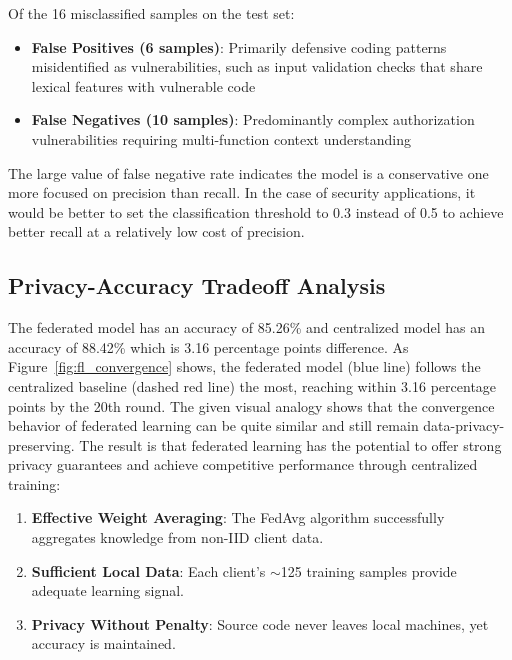 \documentclass[pdflatex,sn-mathphys-num]{sn-jnl}
\theoremstyle{thmstyleone}%
\theoremstyle{thmstyletwo}%
\theoremstyle{thmstylethree}%
\begin{document}
Of the 16 misclassified samples on the test set:
\begin{itemize}
    \item \textbf{False Positives (6 samples)}: Primarily defensive coding patterns misidentified as vulnerabilities, such as input validation checks that share lexical features with vulnerable code
    \item \textbf{False Negatives (10 samples)}: Predominantly complex authorization vulnerabilities requiring multi-function context understanding
\end{itemize}

The large value of false negative rate indicates the model is a conservative one more focused on precision than recall. In the case of security applications, it would be better to set the classification threshold to 0.3 instead of 0.5 to achieve better recall at a relatively low cost of precision.

\subsection{Privacy-Accuracy Tradeoff Analysis}\label{subsec:tradeoff}

The federated model has an accuracy of 85.26\% and centralized model has an accuracy of 88.42\% which is 3.16 percentage points difference. As Figure~\ref{fig:fl_convergence} shows, the federated model (blue line) follows the centralized baseline (dashed red line) the most, reaching within 3.16 percentage points by the 20th round. The given visual analogy shows that the convergence behavior of federated learning can be quite similar and still remain data-privacy-preserving. The result is that federated learning has the potential to offer strong privacy guarantees and achieve competitive performance through centralized training:


\begin{enumerate}
    \item \textbf{Effective Weight Averaging}: The FedAvg algorithm successfully aggregates knowledge from non-IID client data.
    
    \item \textbf{Sufficient Local Data}: Each client's $\sim$125 training samples provide adequate learning signal.
    
    \item \textbf{Privacy Without Penalty}: Source code never leaves local machines, yet accuracy is maintained.
\end{enumerate}
\end{document}

